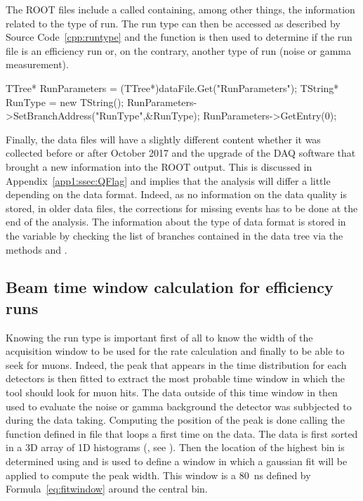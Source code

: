 	The ROOT files include a  called  containing, among other things, the information related to the type of run. The run type can then be accessed as described by Source Code~\ref{cpp:runtype} and the function  is then used to determine if the run file is an efficiency run or, on the contrary, another type of run (noise or gamma measurement).\\
	
	\begin{code}
	\begin{cppcode}
TTree* RunParameters = (TTree*)dataFile.Get("RunParameters");
TString* RunType = new TString();
RunParameters->SetBranchAddress("RunType",&RunType);
RunParameters->GetEntry(0);
	\end{cppcode}
	\label{cpp:runtype}
	\vspace{5mm}
	\end{code}
	
	Finally, the data files will have a slightly different content whether it was collected before or after October 2017 and the upgrade of the DAQ software that brought a new information into the ROOT output. This is discussed in Appendix~\ref{app1:ssec:QFlag} and implies that the analysis will differ a little depending on the data format. Indeed, as no information on the data quality is stored, in older data files, the corrections for missing events has to be done at the end of the analysis. The information about the type of data format is stored in the variable  by checking the list of branches contained in the data tree via the methods  and .
	
	\subsection{Beam time window calculation for efficiency runs}
	\label{app2:ssec:beamwindow}
	
	Knowing the run type is important first of all to know the width of the acquisition window to be used for the rate calculation and finally to be able to seek for muons. Indeed, the peak that appears in the time distribution for each detectors is then fitted to extract the most probable time window in which the tool should look for muon hits. The data outside of this time window in then used to evaluate the noise or gamma background the detector was subbjected to during the data taking. Computing the position of the peak is done calling the function  defined in file  that loops a first time on the data. The data is first sorted in a 3D array of 1D histograms (, see ). Then the location of the highest bin is determined using  and is used to define a window in which a gaussian fit will be applied to compute the peak width. This window is a \SI{80}{ns} defined by Formula~\ref{eq:fitwindow} around the central bin.
	
